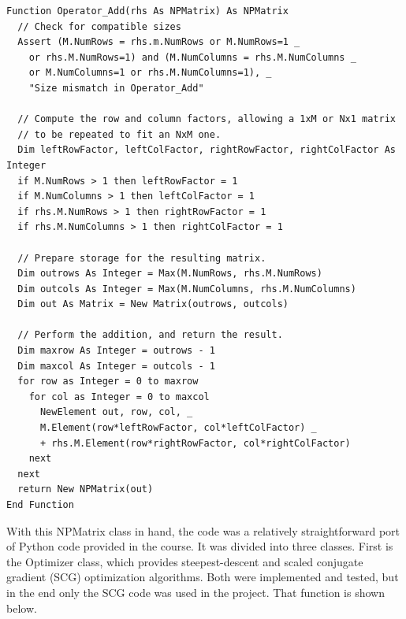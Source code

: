 \documentclass{article}
\begin{document}
\begin{lstlisting}
Function Operator_Add(rhs As NPMatrix) As NPMatrix
  // Check for compatible sizes
  Assert (M.NumRows = rhs.m.NumRows or M.NumRows=1 _
  	or rhs.M.NumRows=1) and (M.NumColumns = rhs.M.NumColumns _
  	or M.NumColumns=1 or rhs.M.NumColumns=1), _
    "Size mismatch in Operator_Add"
  
  // Compute the row and column factors, allowing a 1xM or Nx1 matrix
  // to be repeated to fit an NxM one.
  Dim leftRowFactor, leftColFactor, rightRowFactor, rightColFactor As Integer
  if M.NumRows > 1 then leftRowFactor = 1
  if M.NumColumns > 1 then leftColFactor = 1
  if rhs.M.NumRows > 1 then rightRowFactor = 1
  if rhs.M.NumColumns > 1 then rightColFactor = 1
  
  // Prepare storage for the resulting matrix.
  Dim outrows As Integer = Max(M.NumRows, rhs.M.NumRows)
  Dim outcols As Integer = Max(M.NumColumns, rhs.M.NumColumns)
  Dim out As Matrix = New Matrix(outrows, outcols)
  
  // Perform the addition, and return the result.
  Dim maxrow As Integer = outrows - 1
  Dim maxcol As Integer = outcols - 1
  for row as Integer = 0 to maxrow
    for col as Integer = 0 to maxcol
      NewElement out, row, col, _
      M.Element(row*leftRowFactor, col*leftColFactor) _
      + rhs.M.Element(row*rightRowFactor, col*rightColFactor)
    next
  next
  return New NPMatrix(out) 
End Function
\end{lstlisting}

With this NPMatrix class in hand, the code was a relatively straightforward port of Python code provided in the course.  It was divided into three classes.  First is the Optimizer class, which provides steepest-descent and scaled conjugate gradient (SCG) optimization algorithms.  Both were implemented and tested, but in the end only the SCG code was used in the project.  That function is shown below.
\end{document}
